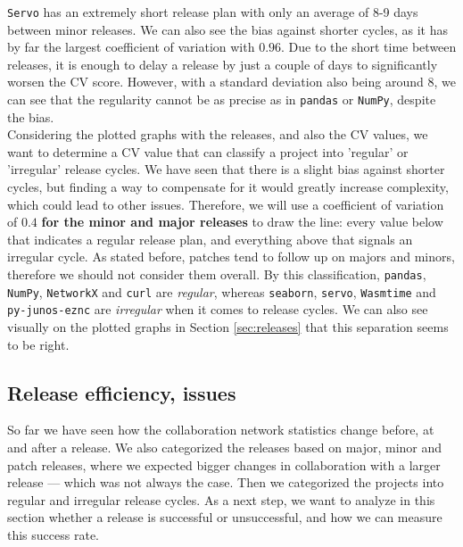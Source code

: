 \texttt{Servo} has an extremely short release plan with only an average of 8-9 days between minor releases. We can also see the bias against shorter cycles, as it has by far the largest coefficient of variation with $0.96$. Due to the short time between releases, it is enough to delay a release by just a couple of days to significantly worsen the CV score. However, with a standard deviation also being around 8, we can see that the regularity cannot be as precise as in \texttt{pandas} or \texttt{NumPy}, despite the bias. \\

Considering the plotted graphs with the releases, and also the CV values, we want to determine a CV value that can classify a project into 'regular' or 'irregular' release cycles. We have seen that there is a slight bias against shorter cycles, but finding a way to compensate for it would greatly increase complexity, which could lead to other issues. Therefore, we will use a coefficient of variation of $0.4$ \textbf{for the minor and major releases} to draw the line: every value below that indicates a regular release plan, and everything above that signals an irregular cycle. As stated before, patches tend to follow up on majors and minors, therefore we should not consider them overall.  By this classification, \texttt{pandas}, \texttt{NumPy}, \texttt{NetworkX} and \texttt{curl} are \textit{regular}, whereas \texttt{seaborn}, \texttt{servo}, \texttt{Wasmtime} and \texttt{py-junos-eznc} are \textit{irregular} when it comes to release cycles. We can also see visually on the plotted graphs in Section \ref{sec:releases} that this separation seems to be right.

\subsection{Release efficiency, issues}

So far we have seen how the collaboration network statistics change before, at and after a release. We also categorized the releases based on major, minor and patch releases, where we expected bigger changes in collaboration with a larger release — which was not always the case. Then we categorized the projects into regular and irregular release cycles. As a next step, we want to analyze in this section whether a release is successful or unsuccessful, and how we can measure this success rate.

